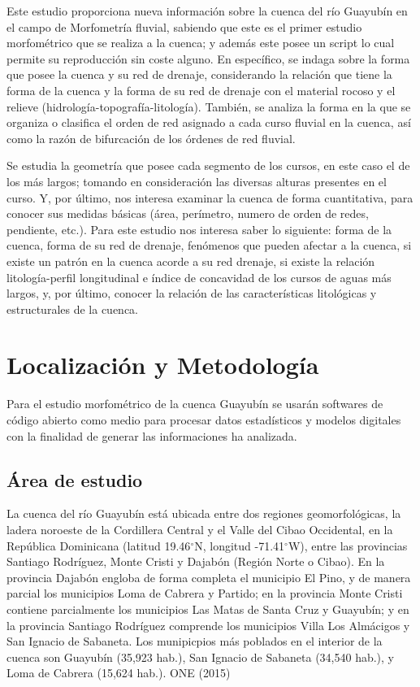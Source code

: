 \documentclass[11pt,]{article}
\begin{document}
Este estudio proporciona nueva información sobre la cuenca del río
Guayubín en el campo de Morfometría fluvial, sabiendo que este es el
primer estudio morfométrico que se realiza a la cuenca; y además este
posee un script lo cual permite su reproducción sin coste alguno. En
específico, se indaga sobre la forma que posee la cuenca y su red de
drenaje, considerando la relación que tiene la forma de la cuenca y la
forma de su red de drenaje con el material rocoso y el relieve
(hidrología-topografía-litología). También, se analiza la forma en la
que se organiza o clasifica el orden de red asignado a cada curso
fluvial en la cuenca, así como la razón de bifurcación de los órdenes de
red fluvial.

Se estudia la geometría que posee cada segmento de los cursos, en este
caso el de los más largos; tomando en consideración las diversas alturas
presentes en el curso. Y, por último, nos interesa examinar la cuenca de
forma cuantitativa, para conocer sus medidas básicas (área, perímetro,
numero de orden de redes, pendiente, etc.). Para este estudio nos
interesa saber lo siguiente: forma de la cuenca, forma de su red de
drenaje, fenómenos que pueden afectar a la cuenca, si existe un patrón
en la cuenca acorde a su red drenaje, si existe la relación
litología-perfil longitudinal e índice de concavidad de los cursos de
aguas más largos, y, por último, conocer la relación de las
características litológicas y estructurales de la cuenca.

\section{Localización y
Metodología}\label{localizaciuxf3n-y-metodologuxeda}

Para el estudio morfométrico de la cuenca Guayubín se usarán softwares
de código abierto como medio para procesar datos estadísticos y modelos
digitales con la finalidad de generar las informaciones ha analizada.

\subsection{Área de estudio}\label{uxe1rea-de-estudio}

La cuenca del río Guayubín está ubicada entre dos regiones
geomorfológicas, la ladera noroeste de la Cordillera Central y el Valle
del Cibao Occidental, en la República Dominicana (latitud
19.46\(^\circ\)N, longitud -71.41\(^\circ\)W), entre las provincias
Santiago Rodríguez, Monte Cristi y Dajabón (Región Norte o Cibao). En la
provincia Dajabón engloba de forma completa el municipio El Pino, y de
manera parcial los municipios Loma de Cabrera y Partido; en la provincia
Monte Cristi contiene parcialmente los municipios Las Matas de Santa
Cruz y Guayubín; y en la provincia Santiago Rodríguez comprende los
municipios Villa Los Almácigos y San Ignacio de Sabaneta. Los
munipicpios más poblados en el interior de la cuenca son Guayubín
(35,923 hab.), San Ignacio de Sabaneta (34,540 hab.), y Loma de Cabrera
(15,624 hab.). ONE (2015)
\end{document}
